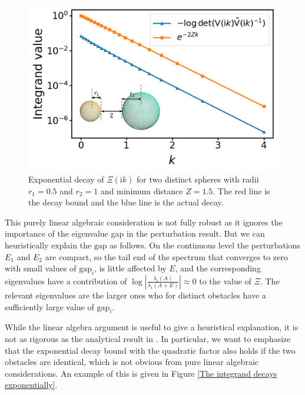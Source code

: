 \begin{figure}[H]
    \centering
    \includegraphics[scale = 0.7]{figures/Scalar_integ_decay_unequal.png}
    \caption{Exponential decay of $\Xi(\textrm{i}k)$ for two distinct spheres with radii $r_{1} = 0.5$ and $r_{2} = 1$ and minimum distance $Z=1.5$. The red line is the decay bound and the blue line is the actual decay.}
    \label{Distinct:The integrand decays exponentially}
\end{figure}

This purely linear algebraic consideration is not fully robust as it ignores the importance of the eigenvalue gap in the perturbation result. But we can 
heuristically explain the $\text{gap}$ as follows. On the continuous level the perturbations $E_1$ and $E_2$ are compact, so the tail end of the spectrum 
that converges to zero with small values of $\text{gap}_i$, is little affected by $E$, and the corresponding eigenvalues have a contribution of 
$\log \left|\frac{\lambda_i(A)}{\lambda_i(A+E)}\right| \approx 0$ to the value of $\Xi$. The relevant eigenvalues are the larger ones who for distinct obstacles 
have a sufficiently large value of $\text{gap}_i$.

While the linear algebra argument is useful to give a heuristical explanation, it is not as rigorous as the analytical result in \cite{fang2022trace}. In particular, we want to emphasize that the exponential decay bound with the quadratic factor also holds if the two obstacles are identical, which is not obvious from pure linear algebraic considerations. An example of this is given in Figure \ref{The integrand decays exponentially}.

